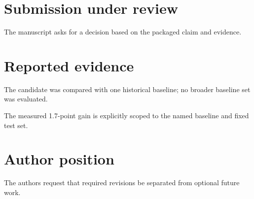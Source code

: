 \documentclass{article}
\begin{document}
\section{Submission under review}
The manuscript asks for a decision based on the packaged claim and evidence.
\section{Reported evidence}
The candidate was compared with one historical baseline; no broader baseline set was evaluated.

The measured 1.7-point gain is explicitly scoped to the named baseline and fixed test set.
\section{Author position}
The authors request that required revisions be separated from optional future work.
\end{document}

